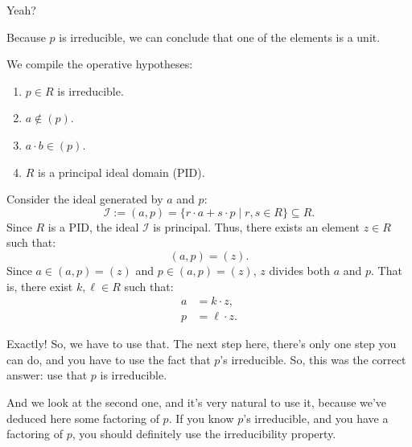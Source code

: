 \begin{proofWrapper}
\begin{speech}[00:50:42 - 00:50:50]
Yeah?
\end{speech}

\begin{student}
Because $p$ is irreducible, we can conclude that one of the elements is a unit.
\end{student}

\begin{content}
We compile the operative hypotheses:
\begin{enumerate}[label=\textbf{(\arabic*)}]
    \item $p \in R$ is irreducible.
    \item $a \notin (p)$.
    \item $a \cdot b \in (p)$.
    \item $R$ is a principal ideal domain (PID).
\end{enumerate}

Consider the ideal generated by $a$ and $p$:
\begin{equation}\label{eq:part3-def-ideal-iap}
\mathcal{I} := (a, p) = \{ r \cdot a + s \cdot p \mid r, s \in R \} \subseteq R.
\end{equation}
Since $R$ is a PID, the ideal $\mathcal{I}$ is principal. Thus, there exists an element $z \in R$ such that:
\begin{equation}\label{eq:part3-ideal-z}
(a, p) = (z).
\end{equation}
Since $a \in (a, p) = (z)$ and $p \in (a, p) = (z)$, $z$ divides both $a$ and $p$. That is, there exist $k, \ell \in R$ such that:
\begin{align}
a &= k \cdot z, \label{eq:part3-a-kz} \\
p &= \ell \cdot z. \label{eq:part3-p-lz}
\end{align}
\end{content}

\begin{speech}[00:50:50 - 00:52:42]
Exactly! So, we have to use that. The next step here, there's only one step you can do, and you have to use the fact that $p$'s irreducible. So, this was the correct answer: use that $p$ is irreducible. 

And we look at the second one, and it's very natural to use it, because we've deduced here some factoring of $p$. If you know $p$'s irreducible, and you have a factoring of $p$, you should definitely use the irreducibility property.


\end{speech}
\end{proofWrapper}
